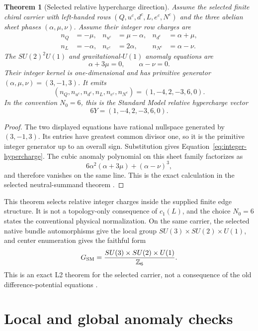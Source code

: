 \documentclass[11pt]{article}
\theoremstyle{plain}
\newtheorem{theorem}{Theorem}[section]
\theoremstyle{definition}
\theoremstyle{remark}
\newcommand{\Z}{\mathbb{Z}}
\begin{document}
\begin{theorem}[Selected relative hypercharge direction]
\label{thm:selected-hypercharge}
Assume the selected finite chiral carrier with left-handed rows
$(Q,u^c,d^c,L,e^c,N^c)$ and the three abelian sheet phases
$(\alpha,\mu,\nu)$. Assume their integer row charges are
\begin{align*}
 n_Q&=-\mu,& n_{u^c}&=\mu-\alpha,&
 n_{d^c}&=\alpha+\mu,\\
 n_L&=-\alpha,& n_{e^c}&=2\alpha,&
 n_{N^c}&=\alpha-\nu.
\end{align*}
The $SU(2)^2U(1)$ and gravitational-$U(1)$ anomaly equations are
\[
 \alpha+3\mu=0,\qquad \alpha-\nu=0.
\]
Their integer kernel is one-dimensional and has primitive generator
$(\alpha,\mu,\nu)=(3,-1,3)$. It emits
\begin{equation}
 (n_Q,n_{u^c},n_{d^c},n_L,n_{e^c},n_{N^c})
 =(1,-4,2,-3,6,0).
 \label{eq:integer-hypercharge}
\end{equation}
In the convention $N_0=6$, this is the Standard Model relative hypercharge
vector
\[
 6Y=(1,-4,2,-3,6,0).
\]
\end{theorem}

\begin{proof}
The two displayed equations have rational nullspace generated by
$(3,-1,3)$. Its entries have greatest common divisor one, so it is the
primitive integer generator up to an overall sign. Substitution gives
Equation~\eqref{eq:integer-hypercharge}. The cubic anomaly polynomial on this
sheet family factorizes as
\[
 6\alpha^2(\alpha+3\mu)+(\alpha-\nu)^3,
\]
and therefore vanishes on the same line. This is the exact calculation in the
selected neutral-summand theorem \cite{MTTHypercharge}.
\end{proof}

This theorem selects relative integer charges inside the supplied finite edge
structure. It is not a topology-only consequence of $c_1(L)$, and the choice
$N_0=6$ states the conventional physical normalization. On the same carrier,
the selected native bundle automorphisms give the local group
$SU(3)\times SU(2)\times U(1)$, and center enumeration gives the faithful form
\begin{equation}
 G_{\rm SM}=\frac{SU(3)\times SU(2)\times U(1)}{\Z_6}.
 \label{eq:global-sm-group}
\end{equation}
This is an exact L2 theorem for the selected carrier, not a consequence of the
old difference-potential equations \cite{MTTNativeGauge}.

\section{Local and global anomaly checks}
\end{document}
